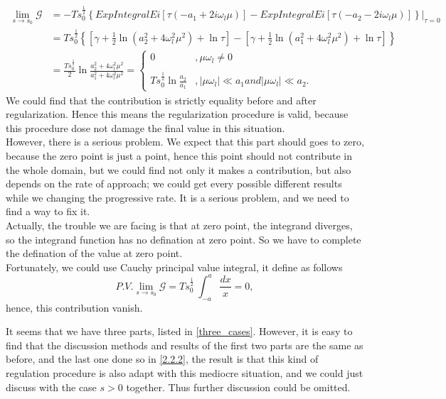 \documentclass{article}
\begin{document}
\begin{equation}
    \begin{split}
        \lim_{s\rightarrow s_0}\mathcal{G} 
        &=- T s_0^\frac{1}{2}\left\{ExpIntegralEi[\tau\left(-a_1+2i\omega_l\mu\right)]-ExpIntegralEi[\tau\left(-a_2-2i\omega_l\mu\right)]\right\}\lvert_{\tau=0}\\
        &= T s_0^\frac{1}{2}\left\{\left[\gamma+\frac{1}{2}\ln \left(a_2^2+4\omega_l^2\mu^2\right)+\ln\tau\right]-\left[\gamma+\frac{1}{2}\ln \left(a_1^2+4\omega_l^2\mu^2\right)+\ln\tau\right]\right\}\\
        &= \frac{T s_0^\frac{1}{2}}{2}\ln \frac{a_2^2+4\omega_l^2\mu^2}{a_1^2+4\omega_l^2\mu^2}
        =
            \begin{cases}
                0 &, \mu \omega_l\neq0\\ \\
                T s_0^{\frac{1}{2}}\ln \frac{a_2}{a_1} &,\left|\mu \omega_l\right|\ll a_1and\left|\mu \omega_l\right|\ll a_2.
            \end{cases}       
    \end{split}    
\end{equation}
We could find that the contribution is strictly equality before and after regularization. Hence this means the regularization procedure is valid, because this procedure dose not damage the final value in this situation.\\
However, there is a serious problem. We expect that this part should goes to zero, because the zero point is just a point, hence this point should not contribute in the whole domain, but we could find not only it makes a contribution, but also depends on the rate of approach; we could get every possible different results while we changing the progressive rate. It is a serious problem, and we need to find a way to fix it.\\
Actually, the trouble we are facing is that at zero point, the integrand diverges, so the integrand function has no defination at zero point. So we have to complete the defination of the value at zero point.\\
Fortunately, we could use Cauchy principal value integral, it define as follows
\begin{equation}
        P.V.\lim_{s\rightarrow s_0}\mathcal{G} 
        =T s_0^{\frac{1}{2}}\ \int_{-a}^{a}\frac{dx}{x}
        =0
        ,
\end{equation} 
hence, this contribution vanish.

It seems that we have three parts, listed in \autoref{three_cases}. However, it is easy to find that the discussion methods and results of the first two parts are the same as before, and the last one done so in \autoref{2.2.2}, the result is that this kind of regulation procedure is also adapt with this mediocre situation, and we could just discuss with the case $s>0$ together. Thus further discussion could be omitted.
\end{document}
